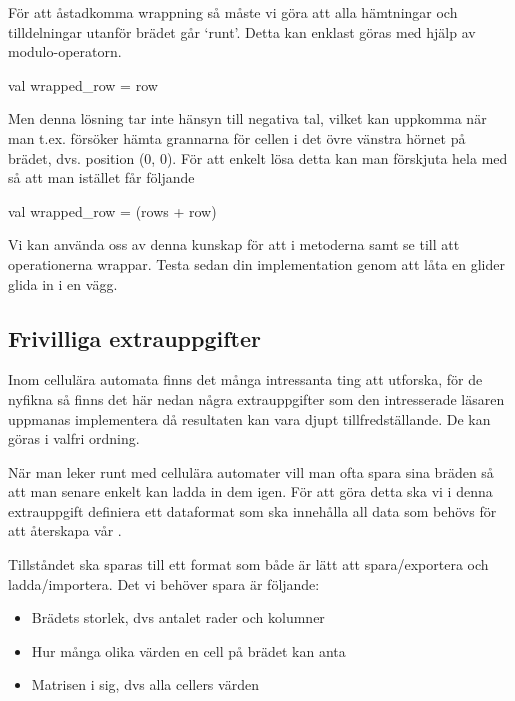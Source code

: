         
        För att åstadkomma wrappning så måste vi göra att alla hämtningar och tilldelningar utanför brädet går `runt'. Detta kan enklast göras med hjälp av modulo-operatorn.
        
\begin{Code}
val wrapped_row = row %
\end{Code}

		Men denna lösning tar inte hänsyn till negativa tal, vilket kan uppkomma när man t.ex. försöker hämta grannarna för cellen i det övre vänstra hörnet på brädet, dvs. position (0, 0). För att enkelt lösa detta kan man förskjuta hela  med  så att man istället får följande
		
\begin{Code}
val wrapped_row = (rows + row) %
\end{Code}

Vi kan använda oss av denna kunskap för att i metoderna  samt  se till att operationerna wrappar. Testa sedan din implementation genom att låta en glider glida in i en vägg.


\subsection{Frivilliga extrauppgifter}

Inom cellulära automata finns det många intressanta ting att utforska, för de nyfikna så finns det här nedan några extrauppgifter som den intresserade läsaren uppmanas implementera då resultaten kan vara djupt tillfredställande. De kan göras i valfri ordning.



	När man leker runt med cellulära automater vill man ofta spara sina bräden så att man senare enkelt kan ladda in dem igen. För att göra detta ska vi i denna extrauppgift definiera ett dataformat som ska innehålla all data som behövs för att återskapa vår .

        Tillståndet ska sparas till ett format som både är lätt att spara/exportera och ladda/importera. Det vi behöver spara är följande:
        
        \begin{itemize}
        		\item Brädets storlek, dvs antalet rader och kolumner
        		\item Hur många olika värden en cell på brädet kan anta
        		\item Matrisen i sig, dvs alla cellers värden
        	\end{itemize}
        
